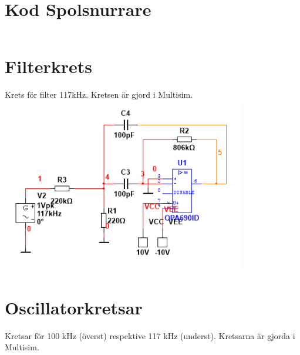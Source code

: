 \documentclass[a4paper]{article}
\begin{document}
\begin{sloppypar}
    \newpage
    \appendices
    \titleformat{\section}[display]
    {\normalfont\Large\bfseries}{\appendixname\enspace\thesection}{.5em}{} %



    \section{Kod Spolsnurrare}
    \label{bilaga:Kod_Spolsnurrare}
    \inputminted[breaklines]{cpp}{./Code/Spolsnurrare.cpp}

    \newpage
    \section{Filterkrets}
    \label{bilaga:Kretsschema-filter}
    Krets för filter 117kHz. Kretsen är gjord i Multisim.
    \includegraphics[width = 0.8\textwidth]{filter117kHz-circuit.png}

    \newpage
    \section{Oscillatorkretsar}
    Kretsar för 100 kHz (överst) respektive 117 kHz (underst). Kretsarna är gjorda i Multisim.


\end{sloppypar}
\end{document}
